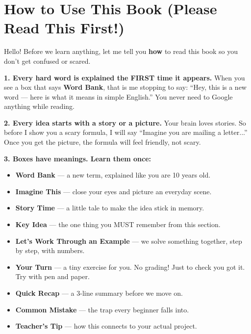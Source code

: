 \documentclass[11pt,a4paper]{article}
\begin{document}
\newpage
\tableofcontents
\newpage

\section*{How to Use This Book (Please Read This First!)}

Hello! Before we learn anything, let me tell you \textbf{how} to read this book
so you don't get confused or scared.

\medskip
\noindent\textbf{1. Every hard word is explained the FIRST time it appears.}
When you see a box that says \textbf{Word Bank}, that is me stopping to say:
``Hey, this is a new word --- here is what it means in simple English.'' You
never need to Google anything while reading.

\medskip
\noindent\textbf{2. Every idea starts with a story or a picture.}
Your brain loves stories. So before I show you a scary formula, I will say
``Imagine you are mailing a letter...'' Once you get the picture, the formula
will feel friendly, not scary.

\medskip
\noindent\textbf{3. Boxes have meanings. Learn them once:}
\begin{itemize}[leftmargin=1.6em,itemsep=2pt]
  \item \textbf{Word Bank} --- a new term, explained like you are 10 years old.
  \item \textbf{Imagine This} --- close your eyes and picture an everyday scene.
  \item \textbf{Story Time} --- a little tale to make the idea stick in memory.
  \item \textbf{Key Idea} --- the one thing you MUST remember from this section.
  \item \textbf{Let's Work Through an Example} --- we solve something together,
        step by step, with numbers.
  \item \textbf{Your Turn} --- a tiny exercise for you. No grading! Just to
        check you got it. Try with pen and paper.
  \item \textbf{Quick Recap} --- a 3-line summary before we move on.
  \item \textbf{Common Mistake} --- the trap every beginner falls into.
  \item \textbf{Teacher's Tip} --- how this connects to your actual project.
\end{itemize}
\end{document}

